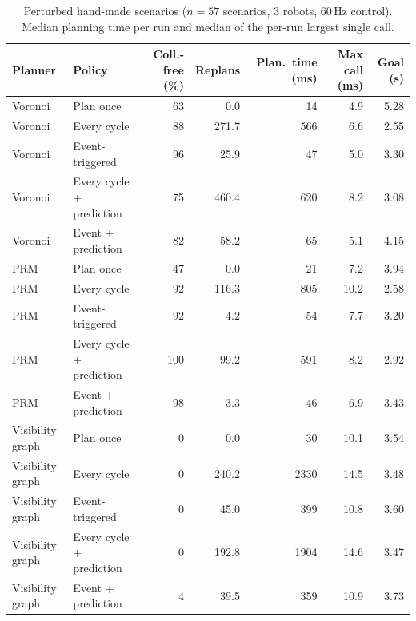 \begin{table}[t]
\centering
\footnotesize
\caption{Perturbed hand-made scenarios ($n=57$ scenarios, 3 robots, 60\,Hz control). Median planning time per run and median of the per-run largest single call.}
\label{tab:perturbed}
\begin{tabular}{llrrrrr}
\hline
Planner & Policy & Coll.-free (\%) & Replans & Plan.\ time (ms) & Max call (ms) & Goal (s) \\
\hline
Voronoi & Plan once & 63 & 0.0 & 14 & 4.9 & 5.28 \\
Voronoi & Every cycle & 88 & 271.7 & 566 & 6.6 & 2.55 \\
Voronoi & Event-triggered & 96 & 25.9 & 47 & 5.0 & 3.30 \\
Voronoi & Every cycle + prediction & 75 & 460.4 & 620 & 8.2 & 3.08 \\
Voronoi & Event + prediction & 82 & 58.2 & 65 & 5.1 & 4.15 \\
PRM & Plan once & 47 & 0.0 & 21 & 7.2 & 3.94 \\
PRM & Every cycle & 92 & 116.3 & 805 & 10.2 & 2.58 \\
PRM & Event-triggered & 92 & 4.2 & 54 & 7.7 & 3.20 \\
PRM & Every cycle + prediction & 100 & 99.2 & 591 & 8.2 & 2.92 \\
PRM & Event + prediction & 98 & 3.3 & 46 & 6.9 & 3.43 \\
Visibility graph & Plan once & 0 & 0.0 & 30 & 10.1 & 3.54 \\
Visibility graph & Every cycle & 0 & 240.2 & 2330 & 14.5 & 3.48 \\
Visibility graph & Event-triggered & 0 & 45.0 & 399 & 10.8 & 3.60 \\
Visibility graph & Every cycle + prediction & 0 & 192.8 & 1904 & 14.6 & 3.47 \\
Visibility graph & Event + prediction & 4 & 39.5 & 359 & 10.9 & 3.73 \\
\hline
\end{tabular}
\end{table}
